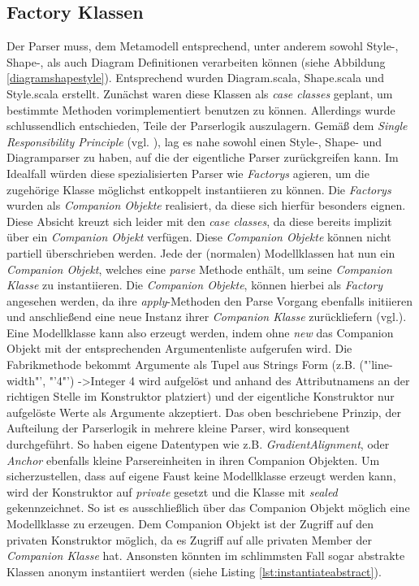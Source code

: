 \subsection{Factory Klassen}
Der Parser muss, dem Metamodell entsprechend, unter anderem sowohl Style-, Shape-, als auch Diagram Definitionen verarbeiten können (siehe Abbildung \ref{diagramshapestyle}). Entsprechend wurden Diagram.scala, Shape.scala und Style.scala erstellt. Zunächst waren diese Klassen als \textit{case classes} geplant, um bestimmte Methoden vorimplementiert benutzen zu können. Allerdings wurde schlussendlich entschieden, Teile der Parserlogik auszulagern. Gemäß dem \textit{Single Responsibility Principle} (vgl. ), lag es nahe sowohl einen Style-, Shape- und Diagramparser zu haben, auf die der eigentliche Parser zurückgreifen kann.
Im Idealfall würden diese spezialisierten Parser wie \textit{Factorys} agieren, um die zugehörige Klasse möglichst entkoppelt instantiieren zu können. Die \textit{Factorys} wurden als \textit{Companion Objekte} realisiert, da diese sich hierfür besonders eignen. Diese Absicht kreuzt sich leider mit den \textit{case classes}, da diese bereits implizit über ein \textit{Companion Objekt} verfügen. Diese \textit{Companion Objekte} können nicht partiell überschrieben werden.
Jede der (normalen) Modellklassen hat nun ein \textit{Companion Objekt}, welches eine \textit{parse} Methode enthält, um seine \textit{Companion Klasse} zu instantiieren.
Die \textit{Companion Objekte}, können hierbei als \textit{Factory} angesehen werden, da ihre \textit{apply}-Methoden den Parse Vorgang ebenfalls initiieren und anschließend eine neue Instanz ihrer \textit{Companion Klasse} zurückliefern (vgl.).
Eine Modellklasse kann also erzeugt werden, indem ohne \textit{new} das Companion Objekt mit der entsprechenden Argumentenliste aufgerufen wird.
Die Fabrikmethode bekommt Argumente als Tupel aus Strings Form (z.B. ("'line-width"', "'4"') -\textgreater  Integer 4 wird aufgelöst und anhand des Attributnamens an der richtigen Stelle im Konstruktor platziert) und der eigentliche Konstruktor nur aufgelöste Werte als Argumente akzeptiert.
Das oben beschriebene Prinzip, der Aufteilung der Parserlogik in mehrere kleine Parser, wird konsequent durchgeführt. So haben eigene Datentypen wie z.B. \textit{GradientAlignment}, oder \textit{Anchor} ebenfalls kleine Parsereinheiten in ihren Companion Objekten.
Um sicherzustellen, dass auf eigene Faust keine Modellklasse erzeugt werden kann, wird der Konstruktor auf \textit{private} gesetzt und die Klasse mit \textit{sealed} gekennzeichnet. So ist es ausschließlich über das Companion Objekt möglich eine Modellklasse zu erzeugen. Dem Companion Objekt ist der Zugriff auf den privaten Konstruktor möglich, da es Zugriff auf alle privaten Member der \textit{Companion Klasse} hat. Ansonsten könnten im schlimmsten Fall sogar abstrakte Klassen anonym instantiiert werden (siehe Listing \ref{lst:instantiateabstract}).
